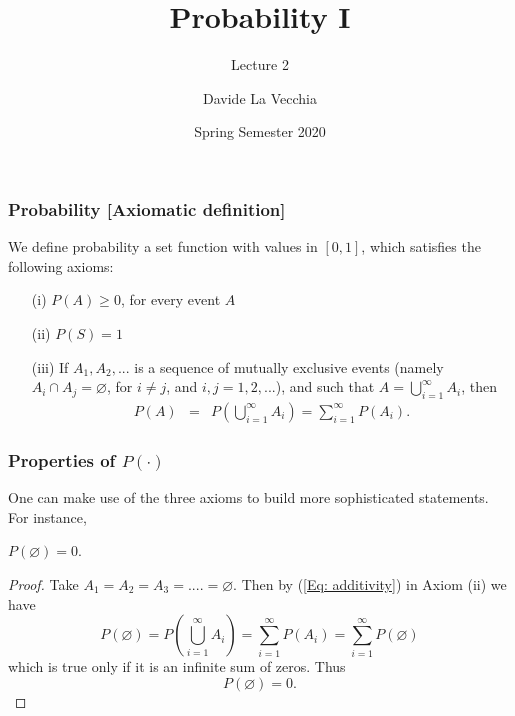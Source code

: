 \documentclass[notes=show,handout]{beamer}
\newcommand{\bea}{\begin{eqnarray}}
\newcommand{\eea}{\end{eqnarray}}
\begin{document}
\title[S110015]{Probability I}
\subtitle{Lecture 2}
\author[La Vecchia]{Davide La Vecchia}
\date{Spring Semester 2020}
\maketitle


\begin{frame}
\frametitle{Probability [Axiomatic definition]}

\begin{definition}
We define probability a set function with values in $[0,1]$, which 
satisfies the following axioms:
\begin{itemize}
\item[ (i)] $P(A) \geq 0$, for every event $A$ 
\item[ (ii)] $P(S)=1$
\item[ (iii)] If $A_1,A_2,...$ is a sequence of mutually exclusive events (namely \color{red}$A_i \cap A_j =\varnothing$, for $i \neq j$, and $i,j=1,2,...$\color{black}), 
and such that
$A = \bigcup_{i=1}^{\infty} A_i$, then
\bea
\label{Eq: additivity}
P(A) &=& P\left(  \bigcup_{i=1}^\infty A_i \right) = \sum_{i=1}^{\infty} P(A_i).
\eea
\end{itemize}
\end{definition}


\end{frame}

\begin{frame}
\frametitle{Properties of $P(\cdot)$}
One can make use of the three axioms to build more sophisticated statements. For instance,

\begin{theorem}
$P(\varnothing)=0$.
\end{theorem}
\vspace{0.3cm}
\begin{footnotesize}{ \begin{proof}
Take $A_1=A_2=A_3=....=\varnothing$. Then by (\ref{Eq: additivity}) in Axiom (ii) we have
$$
P(\varnothing)= P\left(  \bigcup_{i=1}^{\infty} A_i \right) = \sum_{i=1}^{\infty} P(A_i) =\sum_{i=1}^{\infty} P(\varnothing)
$$
which is true only if it is an infinite sum of zeros. Thus 
$$
P(\varnothing) =  0.
$$
\end{proof} }\end{footnotesize}
\end{frame}
\end{document}
